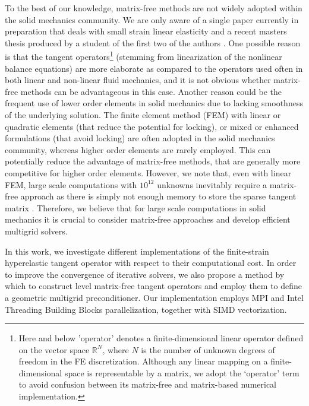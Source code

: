 \documentclass[times,doublespace]{nmeauth}
\begin{document}
To the best of our knowledge, matrix-free methods are not widely adopted within the solid mechanics community.
We are only aware of a single paper currently in preparation that deals with small strain linear elasticity \cite{Clevenger2018} and a recent masters thesis produced by a student of the first two of the authors \cite{Mentler2017}.
One possible reason is that the tangent operators\footnote{{\color{red}Here and
below 'operator' denotes a finite-dimensional linear operator defined on the vector space $\mathbb R^N$, where $N$ is the number of unknown degrees of freedom in the FE discretization.
Although any linear mapping on a finite-dimensional space is representable by a matrix, we adopt the `operator' term to avoid confusion between its matrix-free and matrix-based numerical implementation.
}} (stemming from linearization of the nonlinear balance equations) are
more elaborate as compared to the operators used often in both linear and non-linear fluid mechanics, and it is not obvious whether matrix-free methods can be advantageous in this case.
Another reason could be the {\color{red}frequent} use of lower order elements in solid mechanics due to lacking smoothness of the underlying solution.
The finite element method (FEM) with linear or quadratic elements (that reduce the potential for locking), or mixed or enhanced formulations (that avoid locking) are often adopted in the solid mechanics community,
{\color{red}whereas} higher order elements are rarely employed.
{\color{red}
This can potentially reduce the advantage of matrix-free methods, that are generally more competitive for higher order elements.
}
However, we note that, even with linear FEM, large scale computations with $10^{12}$ unknowns inevitably require a matrix-free approach as there is simply not enough memory to store the sparse tangent matrix \cite{Gmeiner2016}. Therefore, we believe that for large scale computations in solid mechanics it is crucial to consider matrix-free approaches and develop efficient multigrid solvers.

In this work, we investigate different implementations of the finite-strain hyperelastic tangent operator with respect to their computational cost.
In order to improve the convergence of iterative solvers, we also propose a method by which to construct level matrix-free tangent operators
and employ them to define a \mbox{geometric} multigrid preconditioner.
Our implementation employs MPI and Intel Threading Building Blocks parallelization, together with SIMD vectorization.
\end{document}
